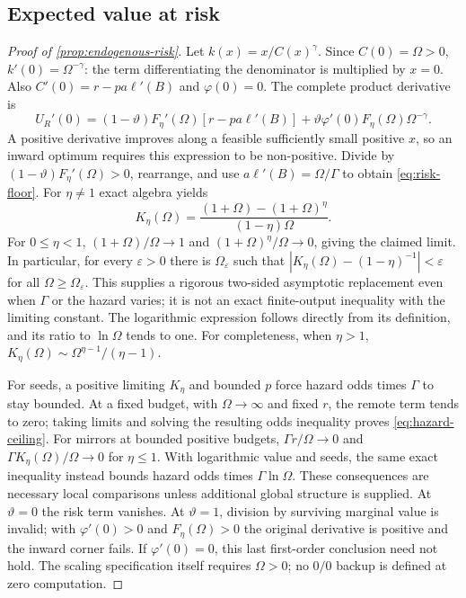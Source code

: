 \documentclass[11pt,a4paper]{article}
\theoremstyle{definition}\newtheorem{definition}{Definition}
\begin{document}
\subsection{Expected value at risk}
\label{app:risk-proof}
\begin{proof}[Proof of \cref{prop:endogenous-risk}]
Let $k(x)=x/C(x)^\gamma$. Since $C(0)=\Omega>0$,
$k'(0)=\Omega^{-\gamma}$: the term differentiating the denominator is
multiplied by $x=0$. Also $C'(0)=r-pa\ell'(B)$ and
$\varphi(0)=0$. The complete product derivative is
\[
 U_R'(0)=(1-\vartheta)F_\eta'(\Omega)[r-pa\ell'(B)]
   +\vartheta\varphi'(0)F_\eta(\Omega)\Omega^{-\gamma}.
\]
A positive derivative improves along a feasible sufficiently small
positive $x$, so an inward optimum requires this expression to be
non-positive. Divide by $(1-\vartheta)F_\eta'(\Omega)>0$, rearrange,
and use $a\ell'(B)=\Omega/\Gamma$ to obtain \cref{eq:risk-floor}.
For $\eta\ne1$ exact algebra yields
\[
 K_\eta(\Omega)=
 \frac{(1+\Omega)-(1+\Omega)^\eta}{(1-\eta)\Omega}.
\]
For $0\leq\eta<1$, $(1+\Omega)/\Omega\to1$ and
$(1+\Omega)^\eta/\Omega\to0$, giving the claimed limit.
In particular, for every $\varepsilon>0$ there is $\Omega_\varepsilon$
such that
$|K_\eta(\Omega)-(1-\eta)^{-1}|<\varepsilon$ for all
$\Omega\geq\Omega_\varepsilon$. This supplies a rigorous two-sided
asymptotic replacement even when $\Gamma$ or the hazard varies; it is
not an exact finite-output inequality with the limiting constant.
The logarithmic expression follows directly from its definition, and
its ratio to $\ln\Omega$ tends to one. For completeness, when $\eta>1$,
$K_\eta(\Omega)\sim\Omega^{\eta-1}/(\eta-1)$.

For seeds, a positive limiting $K_\eta$ and bounded $p$ force hazard
odds times $\Gamma$ to stay bounded. At a fixed budget, with $\Omega\to
\infty$ and fixed $r$, the remote term tends to zero; taking limits
and solving the resulting odds inequality proves \cref{eq:hazard-ceiling}.
For mirrors at bounded positive budgets,
$\Gamma r/\Omega\to0$ and
$\Gamma K_\eta(\Omega)/\Omega\to0$ for $\eta\leq1$.
With logarithmic value and seeds, the same exact inequality instead
bounds hazard odds times $\Gamma\ln\Omega$. These consequences are
necessary local comparisons unless additional global structure is
supplied. At $\vartheta=0$ the risk term vanishes. At
$\vartheta=1$, division by surviving marginal value is invalid; with
$\varphi'(0)>0$ and $F_\eta(\Omega)>0$ the original derivative is
positive and the inward corner fails. If $\varphi'(0)=0$, this last
first-order conclusion need not hold. The scaling specification itself
requires $\Omega>0$; no $0/0$ backup is defined at zero computation.
\end{proof}
\end{document}

